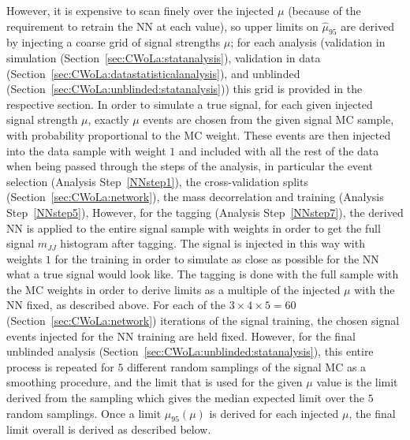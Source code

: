 However, it is expensive to scan finely over the injected $\mu$ (because of the requirement to retrain the NN at each value), so upper limits on $\hat{\mu}_{95}$ are derived by injecting a coarse grid of signal strengths $\mu$; for each analysis (validation in simulation (Section~\ref{sec:CWoLa:statanalysis}), validation in data (Section~\ref{sec:CWoLa:datastatisticalanalysis}), and unblinded (Section~\ref{sec:CWoLa:unblinded:statanalysis})) this grid is provided in the respective section.
In order to simulate a true signal, for each given injected signal strength $\mu$, exactly $\mu$ events are chosen from the given signal MC sample, with probability proportional to the MC weight.
These events are then injected into the data sample with weight $1$ and included with all the rest of the data when being passed through the steps of the analysis, in particular the event selection (Analysis Step~\ref{NNstep1}), the cross-validation splits (Section~\ref{sec:CWoLa:network}), the mass decorrelation and training (Analysis Step~\ref{NNstep5}),
However, for the tagging (Analysis Step~\ref{NNstep7}), the derived NN is applied to the entire signal sample with weights in order to get the full signal $m_{JJ}$ histogram after tagging.
The signal is injected in this way with weights $1$ for the training in order to simulate as close as possible for the NN what a true signal would look like.
The tagging is done with the full sample with the MC weights in order to derive limits as a multiple of the injected $\mu$ with the NN fixed, as described above.
For each of the $3\times4\times5=60$ (Section~\ref{sec:CWoLa:network}) iterations of the signal training, the chosen signal events injected for the NN training are held fixed.
However, for the final unblinded analysis (Section~\ref{sec:CWoLa:unblinded:statanalysis}), this entire process is repeated for $5$ different random samplings of the signal MC as a smoothing procedure, and the limit that is used for the given $\mu$ value is the limit derived from the sampling which gives the median expected limit over the $5$ random samplings.
Once a limit $\mu_{95}(\mu)$ is derived for each injected $\mu$, the final limit overall is derived as described below.

